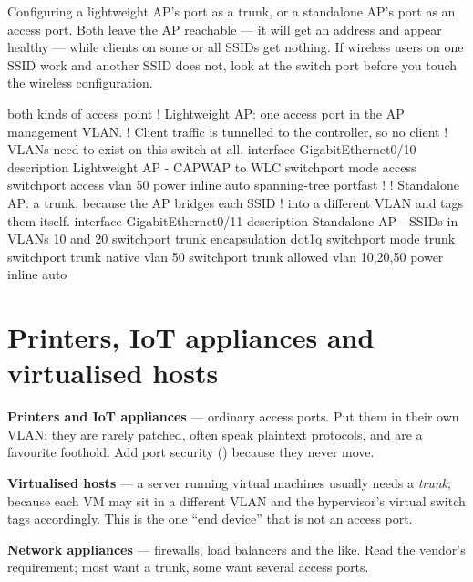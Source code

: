 \begin{alertbox}
Configuring a lightweight AP's port as a trunk, or a standalone AP's port as an
access port. Both leave the AP reachable --- it will get an address and appear
healthy --- while clients on some or all SSIDs get nothing. If wireless users on
one SSID work and another SSID does not, look at the switch port before you touch
the wireless configuration.
\end{alertbox}

\begin{config}{both kinds of access point}
! Lightweight AP: one access port in the AP management VLAN.
! Client traffic is tunnelled to the controller, so no client
! VLANs need to exist on this switch at all.
interface GigabitEthernet0/10
 description Lightweight AP - CAPWAP to WLC
 switchport mode access
 switchport access vlan 50
 power inline auto
 spanning-tree portfast
!
! Standalone AP: a trunk, because the AP bridges each SSID
! into a different VLAN and tags them itself.
interface GigabitEthernet0/11
 description Standalone AP - SSIDs in VLANs 10 and 20
 switchport trunk encapsulation dot1q
 switchport mode trunk
 switchport trunk native vlan 50
 switchport trunk allowed vlan 10,20,50
 power inline auto
\end{config}

\section{Printers, IoT appliances and virtualised hosts}

\begin{tight}
  \item \textbf{Printers and IoT appliances} --- ordinary access ports. Put them
        in their own VLAN: they are rarely patched, often speak plaintext
        protocols, and are a favourite foothold. Add port security
        () because they never move.
  \item \textbf{Virtualised hosts} --- a server running virtual machines usually
        needs a \emph{trunk}, because each VM may sit in a different VLAN and the
        hypervisor's virtual switch tags accordingly. This is the one ``end
        device'' that is not an access port.
  \item \textbf{Network appliances} --- firewalls, load balancers and the like.
        Read the vendor's requirement; most want a trunk, some want several
        access ports.
\end{tight}

